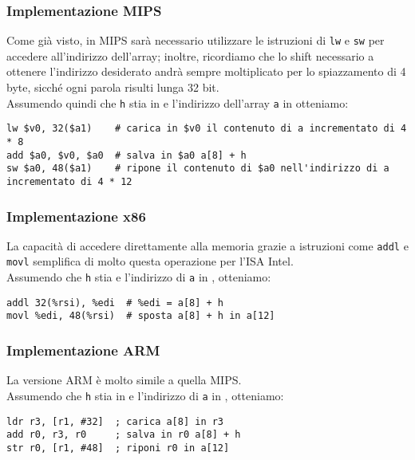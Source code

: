 \documentclass[class=book, crop=false, oneside]{standalone}
\begin{document}
\subsubsection{Implementazione MIPS}
Come già visto, in MIPS sarà necessario utilizzare le istruzioni di \texttt{lw} e \texttt{sw} per accedere all'indirizzo dell'array; inoltre, ricordiamo che  lo shift necessario a ottenere l'indirizzo desiderato andrà sempre moltiplicato per lo spiazzamento di 4 byte, sicché ogni parola risulti lunga 32 bit.\\
Assumendo quindi che \texttt{h} stia in  e l'indirizzo dell'array \texttt{a} in  otteniamo:
\begin{verbatim}
lw $v0, 32($a1)    # carica in $v0 il contenuto di a incrementato di 4 * 8
add $a0, $v0, $a0  # salva in $a0 a[8] + h
sw $a0, 48($a1)    # ripone il contenuto di $a0 nell'indirizzo di a incrementato di 4 * 12
\end{verbatim}

\subsubsection{Implementazione x86}
La capacità di accedere direttamente alla memoria grazie a istruzioni come \texttt{addl} e \texttt{movl} semplifica di molto questa operazione per l'ISA Intel.\\
Assumendo che  \texttt{h} stia  e l'indirizzo di \texttt{a} in , otteniamo:
\begin{verbatim}
addl 32(%rsi), %edi  # %edi = a[8] + h
movl %edi, 48(%rsi)  # sposta a[8] + h in a[12]
\end{verbatim}

\subsubsection{Implementazione ARM}
La versione ARM è molto simile a quella MIPS.\\
Assumendo che \texttt{h} stia in  e l'indirizzo di \texttt{a} in , otteniamo:
\begin{verbatim}
ldr r3, [r1, #32]  ; carica a[8] in r3
add r0, r3, r0     ; salva in r0 a[8] + h
str r0, [r1, #48]  ; riponi r0 in a[12]
\end{verbatim}
\end{document}
